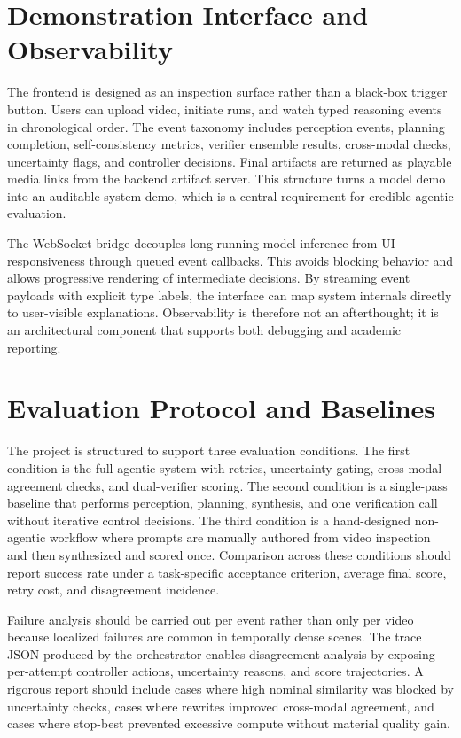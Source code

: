 \documentclass[12pt]{article}
\begin{document}
\section{Demonstration Interface and Observability}

The frontend is designed as an inspection surface rather than a black-box trigger button. Users can upload video, initiate runs, and watch typed reasoning events in chronological order. The event taxonomy includes perception events, planning completion, self-consistency metrics, verifier ensemble results, cross-modal checks, uncertainty flags, and controller decisions. Final artifacts are returned as playable media links from the backend artifact server. This structure turns a model demo into an auditable system demo, which is a central requirement for credible agentic evaluation.

The WebSocket bridge decouples long-running model inference from UI responsiveness through queued event callbacks. This avoids blocking behavior and allows progressive rendering of intermediate decisions. By streaming event payloads with explicit type labels, the interface can map system internals directly to user-visible explanations. Observability is therefore not an afterthought; it is an architectural component that supports both debugging and academic reporting.

\section{Evaluation Protocol and Baselines}

The project is structured to support three evaluation conditions. The first condition is the full agentic system with retries, uncertainty gating, cross-modal agreement checks, and dual-verifier scoring. The second condition is a single-pass baseline that performs perception, planning, synthesis, and one verification call without iterative control decisions. The third condition is a hand-designed non-agentic workflow where prompts are manually authored from video inspection and then synthesized and scored once. Comparison across these conditions should report success rate under a task-specific acceptance criterion, average final score, retry cost, and disagreement incidence.

Failure analysis should be carried out per event rather than only per video because localized failures are common in temporally dense scenes. The trace JSON produced by the orchestrator enables disagreement analysis by exposing per-attempt controller actions, uncertainty reasons, and score trajectories. A rigorous report should include cases where high nominal similarity was blocked by uncertainty checks, cases where rewrites improved cross-modal agreement, and cases where stop-best prevented excessive compute without material quality gain.
\end{document}
